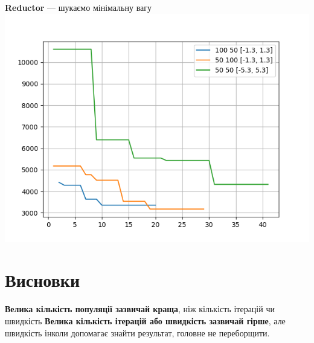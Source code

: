 \documentclass{article}
\begin{document}
        \newpage
        \textbf{Reductor} --- шукаємо мінімальну вагу
            \newline
            \includegraphics[scale=0.7]{Reductor_dif.png}
            \newline
    \newpage
    \section{Висновки}
        \textbf{Велика кількість популяції зазвичай краща}, ніж кількість ітерацій чи швидкість
        \newline
        \textbf{Велика кількість ітерацій або швидкість зазвичай гірше}, але швидкість інколи допомагає знайти результат, головне не переборщити.
\end{document}
